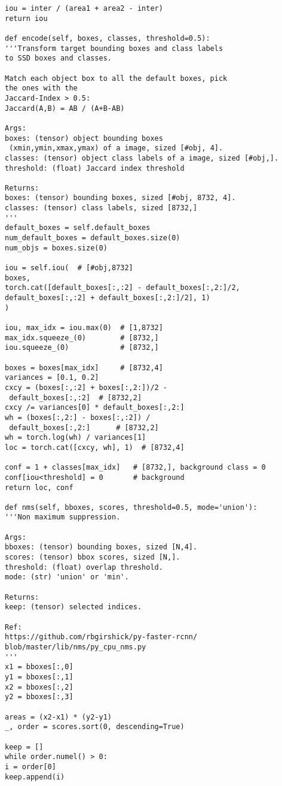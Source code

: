 \begin{lstlisting}
iou = inter / (area1 + area2 - inter)
return iou

def encode(self, boxes, classes, threshold=0.5):
'''Transform target bounding boxes and class labels 
to SSD boxes and classes.

Match each object box to all the default boxes, pick 
the ones with the
Jaccard-Index > 0.5:
Jaccard(A,B) = AB / (A+B-AB)

Args:
boxes: (tensor) object bounding boxes
 (xmin,ymin,xmax,ymax) of a image, sized [#obj, 4].
classes: (tensor) object class labels of a image, sized [#obj,].
threshold: (float) Jaccard index threshold

Returns:
boxes: (tensor) bounding boxes, sized [#obj, 8732, 4].
classes: (tensor) class labels, sized [8732,]
'''
default_boxes = self.default_boxes
num_default_boxes = default_boxes.size(0)
num_objs = boxes.size(0)

iou = self.iou(  # [#obj,8732]
boxes,
torch.cat([default_boxes[:,:2] - default_boxes[:,2:]/2,
default_boxes[:,:2] + default_boxes[:,2:]/2], 1)
)

iou, max_idx = iou.max(0)  # [1,8732]
max_idx.squeeze_(0)        # [8732,]
iou.squeeze_(0)            # [8732,]

boxes = boxes[max_idx]     # [8732,4]
variances = [0.1, 0.2]
cxcy = (boxes[:,:2] + boxes[:,2:])/2 -
 default_boxes[:,:2]  # [8732,2]
cxcy /= variances[0] * default_boxes[:,2:]
wh = (boxes[:,2:] - boxes[:,:2]) /
 default_boxes[:,2:]      # [8732,2]
wh = torch.log(wh) / variances[1]
loc = torch.cat([cxcy, wh], 1)  # [8732,4]

conf = 1 + classes[max_idx]   # [8732,], background class = 0
conf[iou<threshold] = 0       # background
return loc, conf

def nms(self, bboxes, scores, threshold=0.5, mode='union'):
'''Non maximum suppression.

Args:
bboxes: (tensor) bounding boxes, sized [N,4].
scores: (tensor) bbox scores, sized [N,].
threshold: (float) overlap threshold.
mode: (str) 'union' or 'min'.

Returns:
keep: (tensor) selected indices.

Ref:
https://github.com/rbgirshick/py-faster-rcnn/
blob/master/lib/nms/py_cpu_nms.py
'''
x1 = bboxes[:,0]
y1 = bboxes[:,1]
x2 = bboxes[:,2]
y2 = bboxes[:,3]

areas = (x2-x1) * (y2-y1)
_, order = scores.sort(0, descending=True)

keep = []
while order.numel() > 0:
i = order[0]
keep.append(i)


\end{lstlisting}
